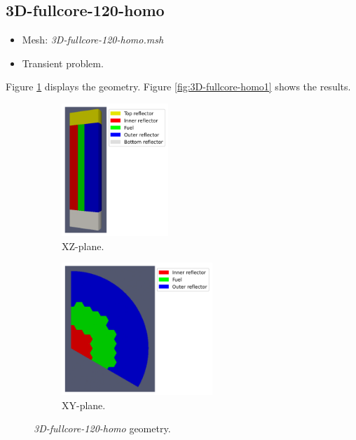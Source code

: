 \documentclass[11pt,letterpaper]{article}
\begin{document}
\subsection{3D-fullcore-120-homo}

	\begin{itemize}
		\item Mesh: \textit{3D-fullcore-120-homo.msh}
		\item Transient problem.
	\end{itemize}

Figure \ref{fig:3D-fullcore-homo} displays the geometry.
Figure \ref{fig:3D-fullcore-homo1} shows the results.

	\begin{figure}[htbp!]
		\centering
		\begin{subfigure}[t]{0.4\textwidth}
			\centering
		\includegraphics[height=5cm]{3D-fullcore-120-homo-meshB1}
			\caption{XZ-plane.}
		\end{subfigure}
		\begin{subfigure}[t]{0.4\textwidth}
			\centering
		\includegraphics[height=5cm]{3D-fullcore-120-homo-meshB2}
			\caption{XY-plane.}
		\end{subfigure}
		\hfill
		\caption{\textit{3D-fullcore-120-homo} geometry.}
		\label{fig:3D-fullcore-homo}
	\end{figure}
\end{document}
